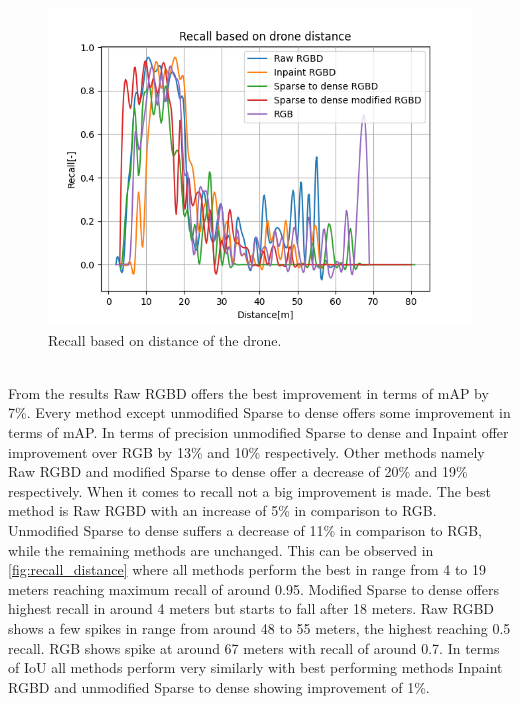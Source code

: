 \documentclass[twoside]{ctuthesis}
\theoremstyle{plain}
\theoremstyle{definition}
\theoremstyle{note}
\begin{document}
\begin{figure}[h!]
	\centering
	\includegraphics[width=\textwidth]{recall_distance.png}
	\caption{Recall based on distance of the drone.} \label{fig:recall_distance}
\end{figure}\\
From the results Raw RGBD offers the best improvement in terms of mAP by 7\%. Every method except unmodified Sparse to dense offers some improvement in terms of mAP. In terms of precision unmodified Sparse to dense and Inpaint offer improvement over RGB by 13\% and 10\% respectively. Other methods namely Raw RGBD and modified Sparse to dense offer a decrease of 20\% and 19\% respectively. When it comes to recall not a big improvement is made. The best method is Raw RGBD with an increase of 5\% in comparison to RGB. Unmodified Sparse to dense suffers a decrease of 11\% in comparison to RGB, while the remaining methods are unchanged. This can be observed in \autoref{fig:recall_distance} where all methods perform the best in range from 4 to 19 meters reaching maximum recall of around 0.95. Modified Sparse to dense offers highest recall in around 4 meters but starts to fall after 18 meters. Raw RGBD shows a few spikes in range from around 48 to 55 meters, the highest reaching 0.5 recall. RGB shows spike at around 67 meters with recall of around 0.7. In terms of IoU all methods perform very similarly with best performing methods Inpaint RGBD and unmodified Sparse to dense showing improvement of 1\%.
\pagebreak
\end{document}
